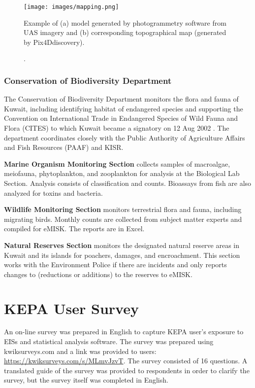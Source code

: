 %
\begin{figure}[H]
\centering
\texttt{[image: images/mapping.png]} 
\caption[Examples of UAS generated model and map].{Example of (a) model generated by photogrammetry software from UAS imagery and (b) corresponding topographical map (generated by Pix4Ddiscovery).}
\label{fig:mapping}
\end{figure}
%

\subsubsection{Conservation of Biodiversity Department}

The Conservation of Biodiversity Department monitors the flora and fauna of Kuwait, including identifying habitat of endangered species and supporting the Convention on International Trade in Endangered Species of Wild Fauna and Flora (CITES) to which Kuwait became a signatory on 12 Aug 2002 \citep{cites2002}. The department coordinates closely with the Public Authority of Agriculture Affairs and Fish Resources (PAAF) and KISR.

\textbf{Marine Organism Monitoring Section} collects samples of macroalgae, meiofauna, phytoplankton, and zooplankton for analysis at the Biological Lab Section. Analysis consists of classification and counts. Bioassays from fish are also analyzed for toxins and bacteria.

\textbf{Wildlife Monitoring Section} monitors terrestrial flora and fauna, including migrating birds. Monthly counts are collected from subject matter experts and compiled for eMISK. The reports are in Excel.

\textbf{Natural Reserves Section} monitors the designated natural reserve areas in Kuwait and its islands for poachers, damages, and encroachment. This section works with the Environment Police if there are incidents and only reports changes to (reductions or additions) to the reserves to eMISK.


\section{KEPA User Survey}
An on-line survey was prepared in English to capture KEPA user's exposure to EISs and statistical analysis software. The survey was prepared using kwiksurveys.com and a link was provided to users: \url{https://kwiksurveys.com/s/MLmvJzvT}. The survey consisted of 16 questions. A translated guide of the survey was provided to respondents in order to clarify the survey, but the survey itself was completed in English.

